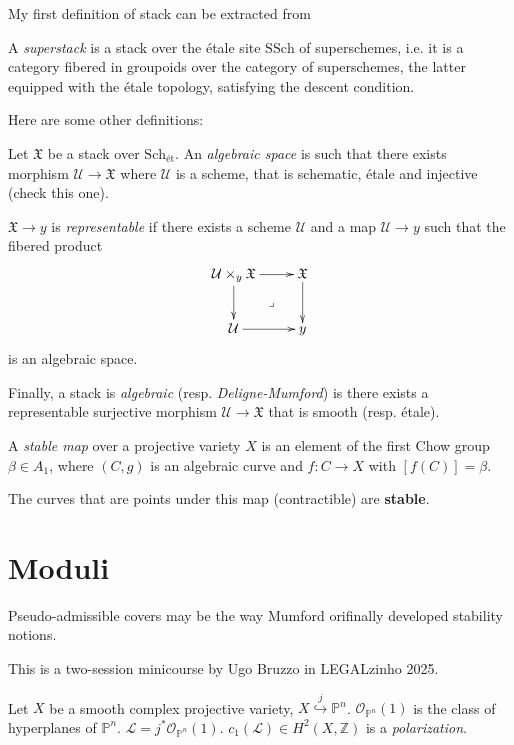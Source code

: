 My first definition of stack can be extracted
from

\begin{definition}
\label{definition-superstack}
A {\it superstack} is a stack over
the étale site $\text{SSch}$ of superschemes,
i.e. it is a category fibered in groupoids
over the category of superschemes,
the latter equipped with the
étale topology,
satisfying the descent condition.
\end{definition}

Here are some other definitions:

\begin{definition}
\label{definition-algebraic-stacks}
Let  $\mathfrak{X}$ be a stack over
$\text{Sch}_{\text{ét}}$.
An {\it algebraic space} is
such that there exists morphism
$\mathcal{U} \to \mathfrak{X}$
where $\mathcal{U}$ is a scheme, that is
schematic, étale and injective (check this
one).

$\mathfrak{X} \to y$ is {\it representable}
if
there exists a scheme $\mathcal{U}$ and a map
$\mathcal{U} \to y$ such that the
fibered product
$$
\xymatrix{
\mathcal{U} \times_y
\mathfrak{X}\ar[r]\ar[d]\ar@{}[dr]|-
{\lrcorner}&\mathfrak{X}\ar[d]\\
\mathcal{U}\ar[r]&y
}
$$
is an algebraic space.

Finally, a  stack is {\it algebraic} (resp.
{\it Deligne-Mumford})
is there exists a
representable surjective morphism
$\mathcal{U} \to \mathfrak{X}$
that is smooth (resp. étale).

A {\it stable map} over a projective
variety $X$ is an element of the first
Chow group $\beta \in A_1$, where
 $(C,g)$ is an algebraic curve and
$f:C \to X$ with $[f(C)]=\beta$.
\end{definition}

\noindent
The curves that are points under this map
(contractible) are {\bf stable}.

\section{Moduli}
\label{section-moduli}

\noindent
Pseudo-admissible covers may be the way
Mumford orifinally developed stability
notions.

\noindent
This is a two-session minicourse by Ugo
Bruzzo
in LEGALzinho 2025.

Let $X$ be a smooth complex projective
variety,
$X \overset{j}{\hookrightarrow}\mathbb{P}^n$.
$\mathcal{O}_{\mathbb{P}^n}(1)$ is the class
of hyperplanes of $\mathbb{P}^n$.
$\mathcal{L}=j^*\mathcal{O}_{\mathbb{P}^n}(1)
$.
$c_1(\mathcal{L})\in H^2(X,\mathbb{Z})$ is
a {\it polarization}.

